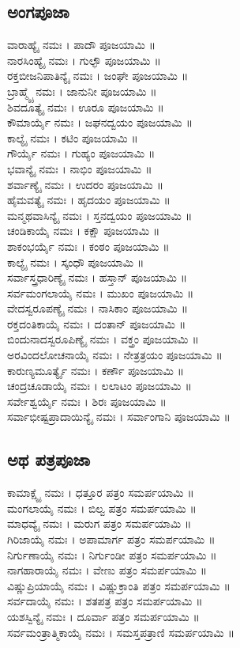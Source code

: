 \subsection{ಅಂಗಪೂಜಾ}
ವಾರಾಹ್ಯೈ ನಮಃ । ಪಾದೌ  ಪೂಜಯಾಮಿ ॥\\
ನಾರಸಿಂಹ್ಯೈ ನಮಃ । ಗುಲ್ಫೌ  ಪೂಜಯಾಮಿ ॥\\
ರಕ್ತಬೀಜನಿಪಾತಿನ್ಯೈ ನಮಃ । ಜಂಘೇ  ಪೂಜಯಾಮಿ ॥\\
ಬ್ರಾಹ್ಮ್ಯೈ ನಮಃ । ಜಾನುನೀ  ಪೂಜಯಾಮಿ ॥\\
ಶಿವದೂತ್ಯೈ ನಮಃ । ಊರೂ  ಪೂಜಯಾಮಿ ॥\\
ಕೌಮಾರ್ಯೈ ನಮಃ । ಜಘನದ್ವಯಂ  ಪೂಜಯಾಮಿ ॥\\
ಕಾಲ್ಯೈ ನಮಃ । ಕಟಿಂ  ಪೂಜಯಾಮಿ ॥\\
ಗೌರ್ಯೈ ನಮಃ । ಗುಹ್ಯಂ  ಪೂಜಯಾಮಿ ॥\\
ಭವಾನ್ಯೈ ನಮಃ । ನಾಭಿಂ  ಪೂಜಯಾಮಿ ॥\\
ಶರ್ವಾಣ್ಯೈ ನಮಃ । ಉದರಂ  ಪೂಜಯಾಮಿ ॥\\
ಹೈಮವತ್ಯೈ ನಮಃ । ಹೃದಯಂ  ಪೂಜಯಾಮಿ ॥\\
ಮನ್ಮಥವಾಸಿನ್ಯೈ ನಮಃ । ಸ್ತನದ್ವಯಂ  ಪೂಜಯಾಮಿ ॥\\
ಚಂಡಿಕಾಯೈ ನಮಃ । ಕಕ್ಷೌ  ಪೂಜಯಾಮಿ ॥\\
ಶಾಕಂಭರ್ಯೈ ನಮಃ । ಕಂಠಂ  ಪೂಜಯಾಮಿ ॥\\
ಕಾಲ್ಯೈ ನಮಃ । ಸ್ಕಂಧೌ  ಪೂಜಯಾಮಿ ॥\\
ಸರ್ವಾಸ್ತ್ರಧಾರಿಣ್ಯೈ ನಮಃ । ಹಸ್ತಾನ್  ಪೂಜಯಾಮಿ ॥\\
ಸರ್ವಮಂಗಲಾಯೈ ನಮಃ । ಮುಖಂ  ಪೂಜಯಾಮಿ ॥\\
ವೇದಸ್ವರೂಪಣ್ಯೈ ನಮಃ । ನಾಸಿಕಾಂ  ಪೂಜಯಾಮಿ ॥\\
ರಕ್ತದಂತಿಕಾಯೈ ನಮಃ । ದಂತಾನ್  ಪೂಜಯಾಮಿ ॥\\
ಬಿಂದುನಾದಸ್ವರೂಪಿಣ್ಯೈ ನಮಃ । ವಕ್ತ್ರಂ  ಪೂಜಯಾಮಿ ॥\\
ಅರವಿಂದಲೋಚನಾಯೈ ನಮಃ । ನೇತ್ರತ್ರಯಂ  ಪೂಜಯಾಮಿ ॥\\
ಕಾರುಣ್ಯಮೂರ್ತ್ಯೈ ನಮಃ । ಕರ್ಣೌ  ಪೂಜಯಾಮಿ ॥\\
ಚಂದ್ರಚೂಡಾಯೈ ನಮಃ । ಲಲಾಟಂ  ಪೂಜಯಾಮಿ ॥\\
ಸರ್ವೇಶ್ವರ್ಯೈ ನಮಃ । ಶಿರಃ  ಪೂಜಯಾಮಿ ॥\\
ಸರ್ವಾಭೀಷ್ಟಪ್ರಾದಾಯಿನ್ಯೈ ನಮಃ । ಸರ್ವಾಂಗಾನಿ ಪೂಜಯಾಮಿ ॥
\subsection{ಅಥ ಪತ್ರಪೂಜಾ}
ಕಾಮಾಕ್ಷ್ಯೈ ನಮಃ । ಧತ್ತೂರ ಪತ್ರಂ ಸಮರ್ಪಯಾಮಿ ॥\\
ಮಂಗಲಾಯೈ ನಮಃ । ಬಿಲ್ವ ಪತ್ರಂ ಸಮರ್ಪಯಾಮಿ ॥\\
ಮಾಧವ್ಯೈ ನಮಃ । ಮರುಗ ಪತ್ರಂ ಸಮರ್ಪಯಾಮಿ ॥\\
ಗಿರಿಜಾಯೈ ನಮಃ । ಅಪಾಮಾರ್ಗ ಪತ್ರಂ ಸಮರ್ಪಯಾಮಿ ॥\\
ನಿರ್ಗುಣಾಯೈ ನಮಃ । ನಿರ್ಗುಂಡೀ ಪತ್ರಂ ಸಮರ್ಪಯಾಮಿ ॥\\
ನಾಗಹಾರಾಯೈ ನಮಃ । ವೇಣು ಪತ್ರಂ ಸಮರ್ಪಯಾಮಿ ॥\\
ವಿಷ್ಣುಪ್ರಿಯಾಯೈ ನಮಃ । ವಿಷ್ಣುಕ್ರಾಂತಿ ಪತ್ರಂ ಸಮರ್ಪಯಾಮಿ ॥\\
ಸರ್ವದಾಯೈ ನಮಃ । ಶತಪತ್ರ ಪತ್ರಂ ಸಮರ್ಪಯಾಮಿ ॥\\
ಯಶಸ್ವಿನ್ಯೈ ನಮಃ । ದೂರ್ವಾ ಪತ್ರಂ ಸಮರ್ಪಯಾಮಿ ॥\\
ಸರ್ವಮಂತ್ರಾತ್ಮಿಕಾಯೈ ನಮಃ । ಸಮಸ್ತಪತ್ರಾಣಿ  ಸಮರ್ಪಯಾಮಿ ॥
